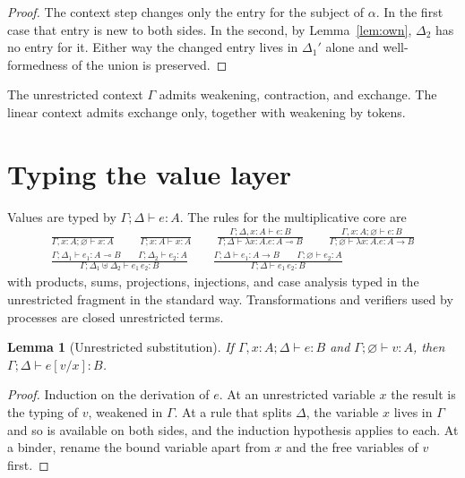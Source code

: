 \documentclass[11pt,openany]{book}
\newtheorem{lemma}[theorem]{Lemma}
\theoremstyle{remark}
\begin{document}
\begin{proof}
The context step changes only the entry for the subject of $\alpha$. In
the first case that entry is new to both sides. In the second, by
Lemma~\ref{lem:own}, $\Delta_2$ has no entry for it. Either way the
changed entry lives in $\Delta_1'$ alone and well-formedness of the union
is preserved.
\end{proof}

The unrestricted context $\Gamma$ admits weakening, contraction, and
exchange. The linear context admits exchange only, together with
weakening by tokens.

\section{Typing the value layer}

Values are typed by $\Gamma;\Delta\vdash e:A$. The rules for the
multiplicative core are
\[
\begin{gathered}
\frac{}{\Gamma,x{:}A;\varnothing\vdash x:A}
\qquad
\frac{}{\Gamma;x{:}A\vdash x:A}
\qquad
\frac{\Gamma;\Delta,x{:}A\vdash e:B}{\Gamma;\Delta\vdash\lambda x{:}A.e:A\multimap B}
\qquad
\frac{\Gamma,x{:}A;\varnothing\vdash e:B}{\Gamma;\varnothing\vdash\lambda x{:}A.e:A\to B}
\\[1ex]
\frac{\Gamma;\Delta_1\vdash e_1:A\multimap B\qquad\Gamma;\Delta_2\vdash e_2:A}
{\Gamma;\Delta_1\uplus\Delta_2\vdash e_1\,e_2:B}
\qquad
\frac{\Gamma;\Delta\vdash e_1:A\to B\qquad\Gamma;\varnothing\vdash e_2:A}
{\Gamma;\Delta\vdash e_1\,e_2:B}
\end{gathered}
\]
with products, sums, projections, injections, and case analysis typed in
the unrestricted fragment in the standard way. Transformations and
verifiers used by processes are closed unrestricted terms.

\begin{lemma}[Unrestricted substitution]\label{lem:usubst}
If $\Gamma,x{:}A;\Delta\vdash e:B$ and $\Gamma;\varnothing\vdash v:A$,
then $\Gamma;\Delta\vdash e[v/x]:B$.
\end{lemma}

\begin{proof}
Induction on the derivation of $e$. At an unrestricted variable $x$ the
result is the typing of $v$, weakened in $\Gamma$. At a rule that splits
$\Delta$, the variable $x$ lives in $\Gamma$ and so is available on both
sides, and the induction hypothesis applies to each. At a binder, rename
the bound variable apart from $x$ and the free variables of $v$ first.
\end{proof}
\end{document}
